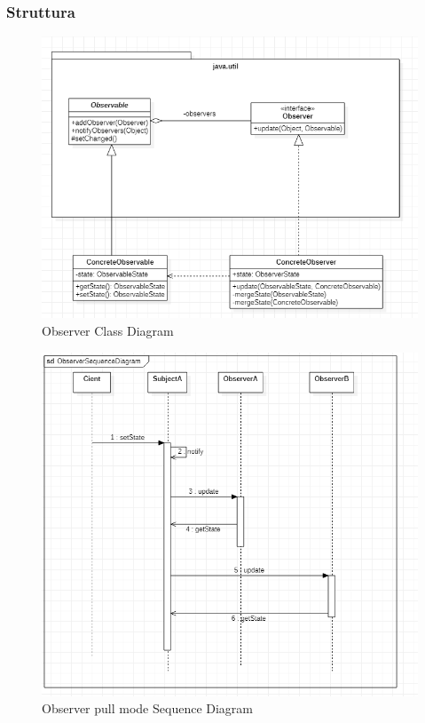 \documentclass{article}
\begin{document}
\subsubsection{Struttura}
\begin{figure} [H]
\begin{center}
\includegraphics[scale=0.5]{ObserverClassDiagram.png}
\end{center}
\caption{Observer Class Diagram}
\end{figure}
\begin{figure} [H]
\begin{center}
\includegraphics[scale=0.5]{ObserverSequenceDiagram.png}
\end{center}
\caption{Observer pull mode Sequence Diagram}
\end{figure}
\end{document}
